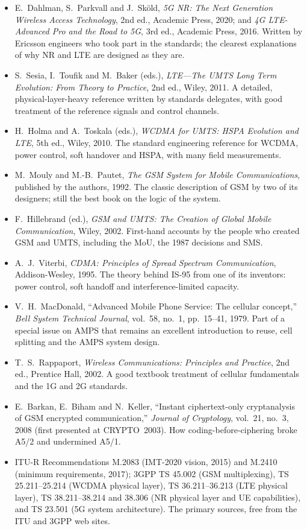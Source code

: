 \furtherreading
\begin{itemize}
\item E.~Dahlman, S.~Parkvall and J.~Sköld, \emph{5G NR: The Next Generation Wireless Access
Technology}, 2nd ed., Academic Press, 2020; and \emph{4G LTE-Advanced Pro and the Road to 5G},
3rd ed., Academic Press, 2016. Written by Ericsson engineers who took part in the standards;
the clearest explanations of why NR and LTE are designed as they are.
\item S.~Sesia, I.~Toufik and M.~Baker (eds.), \emph{LTE---The UMTS Long Term Evolution: From
Theory to Practice}, 2nd ed., Wiley, 2011. A detailed, physical-layer-heavy reference written by
standards delegates, with good treatment of the reference signals and control channels.
\item H.~Holma and A.~Toskala (eds.), \emph{WCDMA for UMTS: HSPA Evolution and LTE}, 5th ed.,
Wiley, 2010. The standard engineering reference for WCDMA, power control, soft handover and
HSPA, with many field measurements.
\item M.~Mouly and M.-B.~Pautet, \emph{The GSM System for Mobile Communications}, published by the
authors, 1992. The classic description of GSM by two of its designers; still the best book on
the logic of the system.
\item F.~Hillebrand (ed.), \emph{GSM and UMTS: The Creation of Global Mobile Communication},
Wiley, 2002. First-hand accounts by the people who created GSM and UMTS, including the MoU, the
1987 decisions and SMS.
\item A.~J.~Viterbi, \emph{CDMA: Principles of Spread Spectrum Communication}, Addison-Wesley,
1995. The theory behind IS-95 from one of its inventors: power control, soft handoff and
interference-limited capacity.
\item V.~H.~MacDonald, ``Advanced Mobile Phone Service: The cellular concept,'' \emph{Bell System Technical Journal}, vol.~58,
no.~1, pp.~15--41, 1979. Part of a special issue on AMPS that remains an excellent introduction
to reuse, cell splitting and the AMPS system design.
\item T.~S.~Rappaport, \emph{Wireless Communications: Principles and Practice}, 2nd ed.,
Prentice Hall, 2002. A good textbook treatment of cellular fundamentals and the 1G and 2G
standards.
\item E.~Barkan, E.~Biham and N.~Keller, ``Instant ciphertext-only cryptanalysis of GSM encrypted
communication,'' \emph{Journal of Cryptology}, vol.~21, no.~3, 2008 (first presented at
CRYPTO~2003). How coding-before-ciphering broke A5/2 and undermined A5/1.
\item ITU-R Recommendations M.2083 (IMT-2020 vision, 2015) and M.2410 (minimum requirements,
2017); 3GPP TS 45.002 (GSM multiplexing), TS 25.211--25.214 (WCDMA physical layer), TS 36.211--36.213
(LTE physical layer), TS 38.211--38.214 and 38.306 (NR physical layer and UE capabilities), and
TS 23.501 (5G system architecture). The primary sources, free from the ITU and 3GPP web sites.
\end{itemize}

